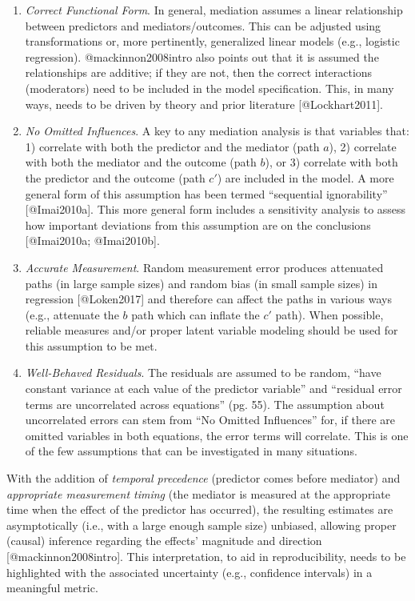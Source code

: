 \documentclass[]{article}
\providecommand{\tightlist}{%
  \setlength{\itemsep}{0pt}\setlength{\parskip}{0pt}}
\begin{document}
\begin{enumerate}
\def\labelenumi{\arabic{enumi}.}
\tightlist
\item
  \emph{Correct Functional Form}. In general, mediation assumes a linear
  relationship between predictors and mediators/outcomes. This can be
  adjusted using transformations or, more pertinently, generalized
  linear models (e.g., logistic regression). @mackinnon2008intro also
  points out that it is assumed the relationships are additive; if they
  are not, then the correct interactions (moderators) need to be
  included in the model specification. This, in many ways, needs to be
  driven by theory and prior literature {[}@Lockhart2011{]}.
\item
  \emph{No Omitted Influences}. A key to any mediation analysis is that
  variables that: 1) correlate with both the predictor and the mediator
  (path \(a\)), 2) correlate with both the mediator and the outcome
  (path \(b\)), or 3) correlate with both the predictor and the outcome
  (path \(c'\)) are included in the model. A more general form of this
  assumption has been termed ``sequential ignorability''
  {[}@Imai2010a{]}. This more general form includes a sensitivity
  analysis to assess how important deviations from this assumption are
  on the conclusions {[}@Imai2010a; @Imai2010b{]}.
\item
  \emph{Accurate Measurement}. Random measurement error produces
  attenuated paths (in large sample sizes) and random bias (in small
  sample sizes) in regression {[}@Loken2017{]} and therefore can affect
  the paths in various ways (e.g., attenuate the \(b\) path which can
  inflate the \(c'\) path). When possible, reliable measures and/or
  proper latent variable modeling should be used for this assumption to
  be met.
\item
  \emph{Well-Behaved Residuals}. The residuals are assumed to be random,
  ``have constant variance at each value of the predictor variable'' and
  ``residual error terms are uncorrelated across equations'' (pg. 55).
  The assumption about uncorrelated errors can stem from ``No Omitted
  Influences'' for, if there are omitted variables in both equations,
  the error terms will correlate. This is one of the few assumptions
  that can be investigated in many situations.
\end{enumerate}

With the addition of \emph{temporal precedence} (predictor comes before
mediator) and \emph{appropriate measurement timing} (the mediator is
measured at the appropriate time when the effect of the predictor has
occurred), the resulting estimates are asymptotically (i.e., with a
large enough sample size) unbiased, allowing proper (causal) inference
regarding the effects' magnitude and direction
{[}@mackinnon2008intro{]}. This interpretation, to aid in
reproducibility, needs to be highlighted with the associated uncertainty
(e.g., confidence intervals) in a meaningful metric.
\end{document}
